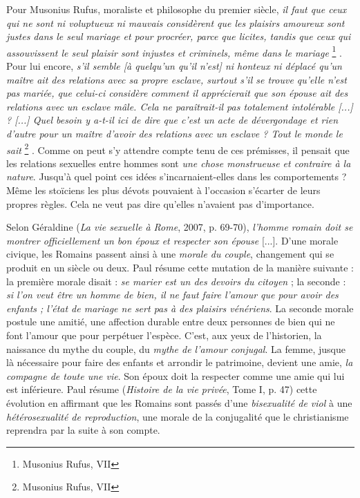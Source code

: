  Pour Musonius Rufus, moraliste et philosophe du premier siècle, {\emph{il faut que ceux qui ne sont ni voluptueux ni mauvais considèrent que les plaisirs amoureux sont justes dans le seul mariage et pour procréer, parce que licites, tandis que ceux qui assouvissent le seul plaisir sont injustes et criminels, même dans le mariage}%
\footnote{Musonius Rufus, VII}%
}. Pour lui encore, {\emph{s'il semble \emph{[à quelqu'un qu'il n'est]} ni honteux ni déplacé qu'un maître ait des relations avec sa propre esclave, surtout s'il se trouve qu'elle n'est pas mariée, que celui-ci considère comment il apprécierait que son épouse ait des relations avec un esclave mâle. Cela ne paraîtrait-il pas totalement intolérable \emph{[...]} ? \emph{[...]} Quel besoin y a-t-il ici de dire que c'est un acte de dévergondage et rien d'autre pour un maître d'avoir des relations avec un esclave ? Tout le monde le sait}%
\footnote{Musonius Rufus, VII}%
}. Comme on peut s'y attendre compte tenu de ces prémisses, il pensait que les relations sexuelles entre hommes sont {\emph{une chose monstrueuse et contraire à la nature}}. Jusqu'à quel point ces idées s'incarnaient-elles dans les comportements ? Même les stoïciens les plus dévots pouvaient à l'occasion s'écarter de leurs propres règles. Cela ne veut pas dire qu'elles n'avaient pas d'importance. 


 Selon Géraldine  (\emph{La vie sexuelle à Rome}, 2007, p. 69-70), {\emph{l'homme romain doit se montrer officiellement un bon époux et respecter son épouse} [...]}. D'une morale civique, les Romains passent ainsi à une {\emph{morale du couple}}, changement qui se produit en un siècle ou deux. Paul  résume cette mutation de la manière suivante : la première morale disait : {\emph{se marier est un des devoirs du citoyen}} ; la seconde : {\emph{si l'on veut être un homme de bien, il ne faut faire l'amour que pour avoir des enfants ; l'état de mariage ne sert pas à des plaisirs vénériens}}. La seconde morale postule une amitié, une affection durable entre deux personnes de bien qui ne font l'amour que pour perpétuer l'espèce. C'est, aux yeux de l'historien, la naissance du mythe du couple, du {\emph{mythe de l'amour conjugal}}. La femme, jusque là nécessaire pour faire des enfants et arrondir le patrimoine, devient une amie, {\emph{la compagne de toute une vie}}. Son époux doit la respecter comme une amie qui lui est inférieure. Paul  résume (\emph{Histoire de la vie privée}, Tome I, p. 47) cette évolution en affirmant que les Romains sont passés d'une {\emph{bisexualité de viol}} à une {\emph{hétérosexualité de reproduction}}, une morale de la conjugalité que le christianisme reprendra par la suite à son compte.

